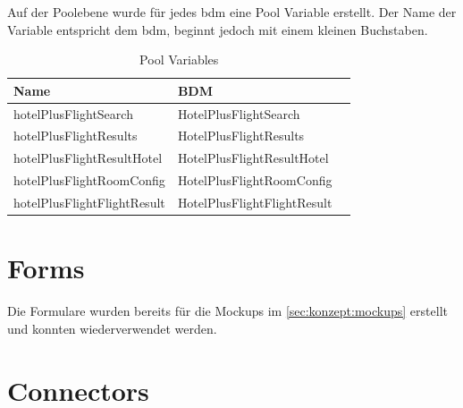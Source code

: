 Auf der Poolebene wurde für jedes \gls{bdm} eine Pool Variable erstellt. Der Name der Variable entspricht dem \gls{bdm}, beginnt jedoch mit einem kleinen Buchstaben.
\begin{table}[H] 
	\caption{Pool Variables}
	\centering
	\label{sec:umsetzung:bdm:poolvariable}
	
	\begin{tabular}{ | l | l | c | } 
		\hline
		\textbf{Name} & \textbf{BDM} \\ \hline 
		hotelPlusFlightSearch & HotelPlusFlightSearch \\ \hline
		hotelPlusFlightResults & HotelPlusFlightResults \\ \hline
		hotelPlusFlightResultHotel & HotelPlusFlightResultHotel \\ \hline
		hotelPlusFlightRoomConfig & HotelPlusFlightRoomConfig \\ \hline
	 	hotelPlusFlightFlightResult & HotelPlusFlightFlightResult \\ \hline
	\end{tabular} 
\end{table}
\section{Forms}
Die Formulare wurden bereits für die Mockups im \cref{sec:konzept:mockups}  erstellt und konnten wiederverwendet werden.

\section{Connectors}

